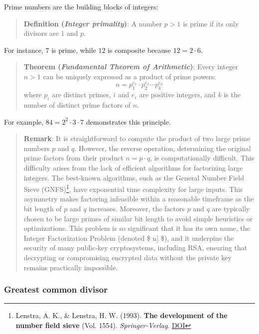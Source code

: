 \documentclass[
  letterpaper,
  DIV=11,
  numbers=noendperiod,
  oneside]{scrartcl}
\begin{document}
Prime numbers are the building blocks of integers:

\begin{quote}
\textbf{Definition (\emph{Integer primality})}: A number \(p > 1\) is
prime if its only divisors are \(1\) and \(p\).
\end{quote}

For instance, \(7\) is prime, while \(12\) is composite because
\(12 = 2 \cdot 6\).

\begin{quote}
\textbf{Theorem (\emph{Fundamental Theorem of Arithmetic})}: Every
integer \(n > 1\) can be uniquely expressed as a product of prime
powers: \[
n = p_1^{e_1} \cdot p_2^{e_2} \cdots p_k^{e_k}
\] where \(p_i\) are distinct primes, \(i\) and \(e_i\) are positive
integers, and \(k\) is the number of distinct prime factors of \(n\).
\end{quote}

For example, \(84 = 2^2 \cdot 3 \cdot 7\) demonstrates this principle.

\begin{quote}
\textbf{Remark}: It is straightforward to compute the product of two
large prime numbers \(p\) and \(q\). However, the reverse operation,
determining the original prime factors from their product
\(n = p \cdot q\), is computationally difficult. This difficulty arises
from the lack of efficient algorithms for factorizing large integers.
The best-known algorithms, such as the General Number Field Sieve
(GNFS)\footnote{Lenstra, A. K., \& Lenstra, H. W. (1993). \textbf{The
  development of the number field sieve} (Vol. 1554).
  \emph{Springer-Verlag}. \href{https://doi.org/10.1007/BFb0091534}{DOI}},
have exponential time complexity for large inputs. This asymmetry makes
factoring infeasible within a reasonable timeframe as the bit length of
\(p\) and \(q\) increases. Moreover, the factors \(p\) and \(q\) are
typically chosen to be large primes of similar bit length to avoid
simple heuristics or optimizations. This problem is so significant that
it has its own name, the Integer Factorization Problem (denoted \$
\text{Fact}{[}n{]} \$), and it underpins the security of many public-key
cryptosystems, including RSA, ensuring that decrypting or compromising
encrypted data without the private key remains practically impossible.
\end{quote}

\subsubsection{Greatest common divisor}\label{greatest-common-divisor}
\end{document}
